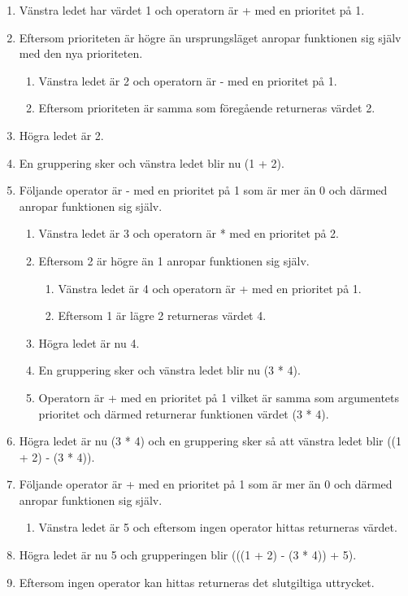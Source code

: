 \begin{enumerate}\itemsep1pt \parskip0pt 
  \item Vänstra ledet har värdet 1 och operatorn är + med en prioritet på 1.
  \item Eftersom prioriteten är högre än ursprungsläget anropar funktionen sig
    själv med den nya prioriteten.
    \begin{enumerate}
      \item Vänstra ledet är 2 och operatorn är - med en prioritet på 1.
      \item Eftersom prioriteten är samma som föregående returneras värdet 2.
    \end{enumerate}
  \item Högra ledet är 2.
  \item En gruppering sker och vänstra ledet blir nu (1 + 2).
  \item Följande operator är - med en prioritet på 1 som är mer än 0 och
    därmed anropar funktionen sig själv.
    \begin{enumerate}
      \item Vänstra ledet är 3 och operatorn är * med en prioritet på 2.
      \item Eftersom 2 är högre än 1 anropar funktionen sig själv.
      \begin{enumerate}
        \item Vänstra ledet är 4 och operatorn är + med en prioritet på 1.
        \item Eftersom 1 är lägre 2 returneras värdet 4.
      \end{enumerate}
      \item Högra ledet är nu 4.
      \item En gruppering sker och vänstra ledet blir nu (3 * 4).
      \item Operatorn är + med en prioritet på 1 vilket är samma som
        argumentets prioritet och därmed returnerar funktionen värdet (3 * 4).
    \end{enumerate}
  \item Högra ledet är nu (3 * 4) och en gruppering sker så att vänstra ledet
    blir ((1 + 2) - (3 * 4)).
  \item Följande operator är + med en prioritet på 1 som är mer än 0 och
    därmed anropar funktionen sig själv.
    \begin{enumerate}
      \item Vänstra ledet är 5 och eftersom ingen operator hittas returneras
        värdet.
    \end{enumerate}
  \item Högra ledet är nu 5 och grupperingen blir (((1 + 2) - (3 * 4)) + 5).
  \item Eftersom ingen operator kan hittas returneras det slutgiltiga
    uttrycket.
\end{enumerate}

